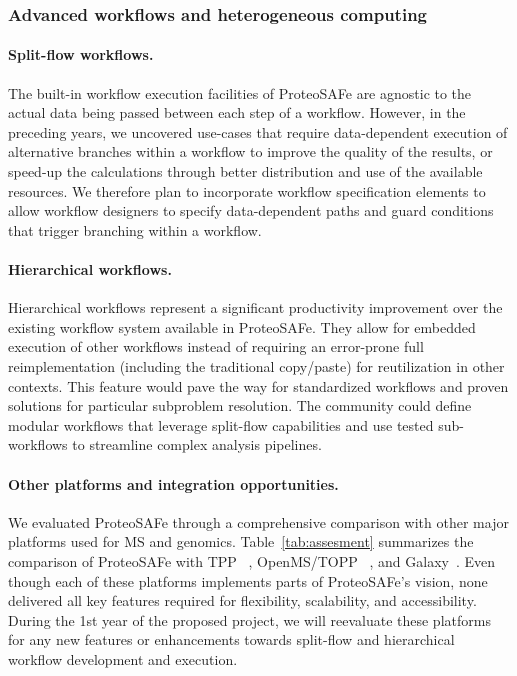 \documentclass[arial,11pt]{article}
\newcommand{\SF}[1]{\textsf{#1}}
\newcommand{\SYSTEM}[0]{\SF{ProteoSAFe}\xspace}
\begin{document}
\subsubsection{Advanced workflows and heterogeneous computing}
\paragraph{Split-flow workflows.} The built-in workflow execution facilities of \SYSTEM are agnostic to the actual data being passed between each step of a workflow. However, in the preceding years, we uncovered use-cases that require data-dependent execution of alternative branches within a workflow to improve the quality of the results, or speed-up the calculations through better distribution and use of the available resources. We therefore plan to incorporate workflow specification elements to allow workflow designers to specify  data-dependent paths and guard conditions that trigger branching within a workflow.

\paragraph{Hierarchical workflows.} Hierarchical workflows represent a significant productivity improvement over the existing workflow system available in \SYSTEM. They allow for embedded execution of other workflows instead of requiring an error-prone full reimplementation (including the traditional copy/paste) for reutilization in other contexts. This feature would pave the way for standardized workflows and proven solutions for particular subproblem resolution. The community could define modular workflows that leverage split-flow capabilities and use tested sub-workflows to streamline complex analysis pipelines.

\paragraph{Other platforms and integration opportunities.}
We evaluated \SYSTEM through a comprehensive comparison with other major platforms used for MS and genomics. Table~\ref{tab:assesment} summarizes the comparison of \SYSTEM with TPP~\cite{Deutsch:2010} , OpenMS/TOPP~\cite{Reinert:2010} , and Galaxy~\cite{Goecks:2010}. Even though each of these platforms implements parts of \SYSTEM's vision, none delivered all key features required for flexibility, scalability, and accessibility. During the 1st year of the proposed project, we will reevaluate these platforms for any new features or enhancements towards split-flow and hierarchical workflow development and execution.
\end{document}
